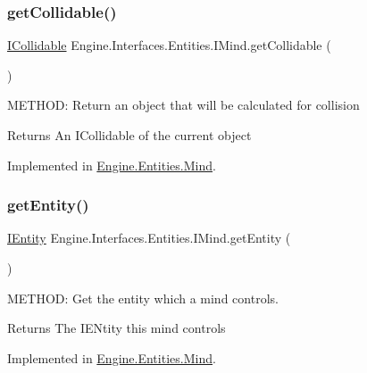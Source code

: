 \subsubsection{\texorpdfstring{get\+Collidable()}{getCollidable()}}
{\footnotesize\ttfamily \hyperlink{a00426}{I\+Collidable} Engine.\+Interfaces.\+Entities.\+I\+Mind.\+get\+Collidable (\begin{DoxyParamCaption}{ }\end{DoxyParamCaption})}



M\+E\+T\+H\+OD\+: Return an object that will be calculated for collision 

\begin{DoxyReturn}{Returns}
An I\+Collidable of the current object
\end{DoxyReturn}


Implemented in \hyperlink{a00318_aa36d6fcb8d80f1398855cea671ce1078}{Engine.\+Entities.\+Mind}.

\mbox{\label{a00446_af7c7cac5148930a12a85ec64412ac6f2}} 
\subsubsection{\texorpdfstring{get\+Entity()}{getEntity()}}
{\footnotesize\ttfamily \hyperlink{a00438}{I\+Entity} Engine.\+Interfaces.\+Entities.\+I\+Mind.\+get\+Entity (\begin{DoxyParamCaption}{ }\end{DoxyParamCaption})}



M\+E\+T\+H\+OD\+: Get the entity which a mind controls. 

\begin{DoxyReturn}{Returns}
The I\+E\+Ntity this mind controls
\end{DoxyReturn}


Implemented in \hyperlink{a00318_a9585d4438e12299a42aaed4ee6fb88b6}{Engine.\+Entities.\+Mind}.

\mbox{\label{a00446_a6f51a819769ba43f5f1702563293aacd}} 
